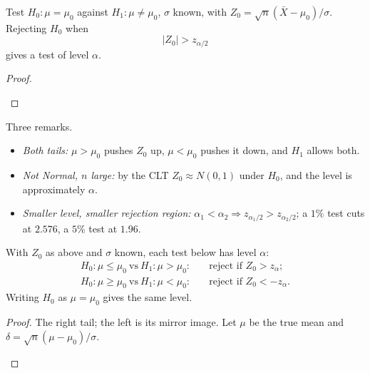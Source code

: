 \begin{theorem}
Test $H_0:\mu=\mu_0$ against $H_1:\mu\ne\mu_0$, $\sigma$ known, with $Z_0=\sqrt n(\bar X-\mu_0)/\sigma$. Rejecting $H_0$ when
\[
  \boxed{\;|Z_0|>z_{\alpha/2}\;}
\]
gives a test of level $\alpha$.
\end{theorem}
\begin{proof}
\begin{deriv}
\end{deriv}
\end{proof}

Three remarks.
\begin{itemize}
  \item \emph{Both tails:} $\mu>\mu_0$ pushes $Z_0$ up, $\mu<\mu_0$ pushes it down, and $H_1$ allows both.
  \item \emph{Not Normal, $n$ large:} by the CLT $Z_0\approx N(0,1)$ under $H_0$, and the level is approximately $\alpha$.
  \item \emph{Smaller level, smaller rejection region:} $\alpha_1<\alpha_2\Rightarrow z_{\alpha_1/2}>z_{\alpha_2/2}$; a $1\%$ test cuts at $2.576$, a $5\%$ test at $1.96$.
\end{itemize}

\begin{theorem}
With $Z_0$ as above and $\sigma$ known, each test below has level $\alpha$:
\[
  \boxed{\;\begin{aligned}
  H_0:\mu\le\mu_0\ \text{vs}\ H_1:\mu>\mu_0:&\quad\text{reject if }Z_0>z_\alpha;\\
  H_0:\mu\ge\mu_0\ \text{vs}\ H_1:\mu<\mu_0:&\quad\text{reject if }Z_0<-z_\alpha.
  \end{aligned}\;}
\]
Writing $H_0$ as $\mu=\mu_0$ gives the same level.
\end{theorem}
\begin{proof}
The right tail; the left is its mirror image. Let $\mu$ be the true mean and $\delta=\sqrt n(\mu-\mu_0)/\sigma$.
\begin{deriv}
\end{deriv}
\end{proof}

